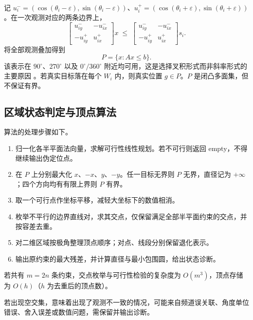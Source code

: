 \documentclass[UTF8,a4paper,zihao=-4,fontset=none]{ctexart}
\begin{document}
记 $u_i^-=(\cos(\theta_i-\varepsilon),\sin(\theta_i-\varepsilon))$、$u_i^+=(\cos(\theta_i+\varepsilon),\sin(\theta_i+\varepsilon))$。在一次观测对应的两条边界上，
\begin{equation}
  \begin{bmatrix}u_{iy}^- & -u_{ix}^-\\[2pt] -u_{iy}^+ & u_{ix}^+\end{bmatrix}x
  \;\le\;
  \begin{bmatrix}u_{iy}^- & -u_{ix}^-\\[2pt] -u_{iy}^+ & u_{ix}^+\end{bmatrix}s_i .
  \label{eq:halfplane}
\end{equation}
将全部观测叠加得到
\begin{equation}
  P=\{x:Ax\le b\}.
  \label{eq:P}
\end{equation}
该表示在 $90^\circ$、$270^\circ$ 以及 $0^\circ/360^\circ$ 附近均可用，这是选择叉积形式而非斜率形式的主要原因 \cite{Tokekar2013}。若真实目标落在每个 $W_i$ 内，则真实位置 $g\in P$。$P$ 是闭凸多面集，但不保证有界。

\subsection{区域状态判定与顶点算法}

算法的处理步骤如下。

\begin{enumerate}[label=(\arabic*),leftmargin=2.2em]
  \item 归一化各半平面法向量，求解可行性线性规划。若不可行则返回 empty，不得继续输出伪定位点。
  \item 在 $P$ 上分别最大化 $x$、$-x$、$y$、$-y$。任一目标无界则 $P$ 无界，直径记为 $+\infty$；四个方向均有有限上界则 $P$ 有界。
  \item 取一个可行点作坐标平移，减轻大坐标下的数值相消。
  \item 枚举不平行的边界直线对，求其交点，仅保留满足全部半平面约束的交点，并按容差去重。
  \item 对二维区域按极角整理顶点顺序；对点、线段分别保留退化表示。
  \item 输出原约束的最大残差，并计算直径与最小包围圆，给出状态诊断。
\end{enumerate}

若共有 $m=2n$ 条约束，交点枚举与可行性检验的复杂度为 $O(m^3)$，顶点存储为 $O(h)$（$h$ 为去重后的顶点数）。

若出现空交集，意味着出现了观测不一致的情况，可能来自频道误关联、角度单位错误、舍入误差或数值问题，需保留并输出诊断。
\end{document}

